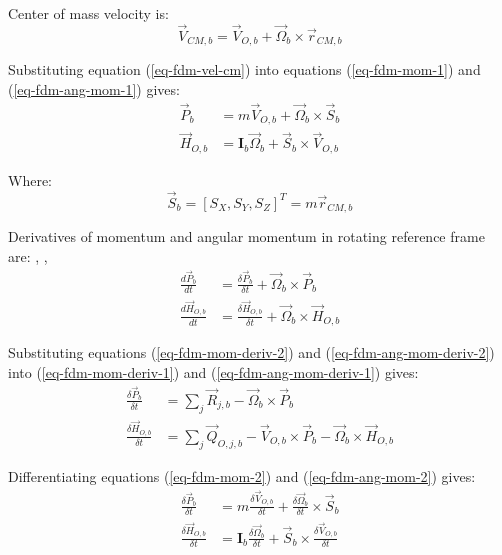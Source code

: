 Center of mass velocity is:
\begin{equation}
  \label{eq-fdm-vel-cm}
  {\vec V}_{CM,b}
  =
  {\vec V}_{O,b} + {\vec \Omega}_b \times {\vec r}_{CM,b}
\end{equation}

Substituting equation (\ref{eq-fdm-vel-cm}) into equations (\ref{eq-fdm-mom-1}) and (\ref{eq-fdm-ang-mom-1}) gives:
\begin{align}
  \label{eq-fdm-mom-2} 
  {\vec P}_b
  &=
  m {\vec V}_{O,b} + {\vec \Omega}_b
  \times
  {\vec S}_b \\
  \label{eq-fdm-ang-mom-2}
  {\vec H}_{O,b}
  &=
  {\boldsymbol I}_b {\vec \Omega}_b
  +
  {\vec S}_b \times {\vec V}_{O,b}
\end{align}

Where:
\begin{equation}
  {\vec S}_b = \left[ S_X, S_Y, S_Z \right]^T = m {\vec r}_{CM,b}
\end{equation}

Derivatives of momentum and angular momentum in rotating reference frame are: \cite{Taylor2005}, \cite{Osinski1997}, \cite{Leyko2002}
\begin{align}
  \label{eq-fdm-mom-deriv-2} 
  \frac{d {\vec P}_b}{dt}
  &=
  \frac{\delta {\vec P}_b}{\delta t}
  +
  {\vec \Omega}_b \times {\vec P}_b \\
  \label{eq-fdm-ang-mom-deriv-2}
  \frac{d {\vec H}_{O,b}}{dt}
  &=
  \frac{\delta {\vec H}_{O,b}}{\delta t}
  +
  {\vec \Omega}_b \times {\vec H}_{O,b}
\end{align}

Substituting equations (\ref{eq-fdm-mom-deriv-2}) and (\ref{eq-fdm-ang-mom-deriv-2}) into (\ref{eq-fdm-mom-deriv-1}) and (\ref{eq-fdm-ang-mom-deriv-1}) gives:
\begin{align}
  \label{eq-fdm-mom-deriv-3}
  \frac{\delta {\vec P}_b}{\delta t}
  &=
  \sum_{j} {\vec R}_{j,b}
  -
  {\vec \Omega}_b \times {\vec P}_b \\
  \label{eq-fdm-ang-mom-deriv-3}
  \frac{\delta {\vec H}_{O,b}}{\delta t}
  &=
  \sum_{j} {\vec Q}_{O,j,b}
  -
  {\vec V}_{O,b} \times {\vec P}_b
  -
  {\vec \Omega}_b \times {\vec H}_{O,b}
\end{align}

Differentiating equations (\ref{eq-fdm-mom-2}) and (\ref{eq-fdm-ang-mom-2}) gives:
\begin{align}
  \label{eq-fdm-mom-deriv-4}
  \frac{\delta {\vec P}_b}{\delta t}
  &=
  m \frac{\delta {\vec V}_{O,b}}{\delta t}
  +
  \frac{\delta {\vec \Omega}_b}{\delta t}
  \times
  {\vec S}_b \\
  \label{eq-fdm-ang-mom-deriv-4}
  \frac{\delta {\vec H}_{O,b}}{\delta t}
  &=
  {\boldsymbol I}_b \frac{\delta {\vec \Omega}_b}{\delta t}
  +
  {\vec S}_b
  \times
  \frac{\delta {\vec V}_{O,b}}{\delta t}
\end{align}

